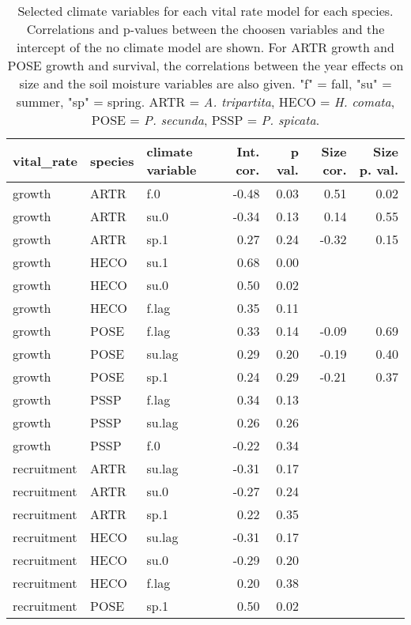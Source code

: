 \begin{table}[ht]
\centering
\caption{Selected climate variables for each vital rate model for each species. Correlations and p-values between the choosen variables and the intercept of the no climate model are shown. For ARTR growth and POSE growth and survival, the correlations between the year effects on size and the soil moisture variables are also given. "f" = fall, "su" = summer, "sp" = spring. ARTR = \textit{A. tripartita}, HECO = \textit{H. comata}, POSE = \textit{P. secunda}, PSSP = \textit{P. spicata}.} 
\label{table:strongCor}
\begin{tabular}{lllrrrr}
  \hline
vital\_rate & species & climate variable & Int. cor. & p val. & Size cor. & Size p. val. \\ 
  \hline
growth & ARTR & f.0 & -0.48 & 0.03 & 0.51 & 0.02 \\ 
  growth & ARTR & su.0 & -0.34 & 0.13 & 0.14 & 0.55 \\ 
  growth & ARTR & sp.1 & 0.27 & 0.24 & -0.32 & 0.15 \\ 
  growth & HECO & su.1 & 0.68 & 0.00 &  &  \\ 
  growth & HECO & su.0 & 0.50 & 0.02 &  &  \\ 
  growth & HECO & f.lag & 0.35 & 0.11 &  &  \\ 
  growth & POSE & f.lag & 0.33 & 0.14 & -0.09 & 0.69 \\ 
  growth & POSE & su.lag & 0.29 & 0.20 & -0.19 & 0.40 \\ 
  growth & POSE & sp.1 & 0.24 & 0.29 & -0.21 & 0.37 \\ 
  growth & PSSP & f.lag & 0.34 & 0.13 &  &  \\ 
  growth & PSSP & su.lag & 0.26 & 0.26 &  &  \\ 
  growth & PSSP & f.0 & -0.22 & 0.34 &  &  \\ 
  recruitment & ARTR & su.lag & -0.31 & 0.17 &  &  \\ 
  recruitment & ARTR & su.0 & -0.27 & 0.24 &  &  \\ 
  recruitment & ARTR & sp.1 & 0.22 & 0.35 &  &  \\ 
  recruitment & HECO & su.lag & -0.31 & 0.17 &  &  \\ 
  recruitment & HECO & su.0 & -0.29 & 0.20 &  &  \\ 
  recruitment & HECO & f.lag & 0.20 & 0.38 &  &  \\ 
  recruitment & POSE & sp.1 & 0.50 & 0.02 &  &  \\ 

\end{tabular}
\end{table}
